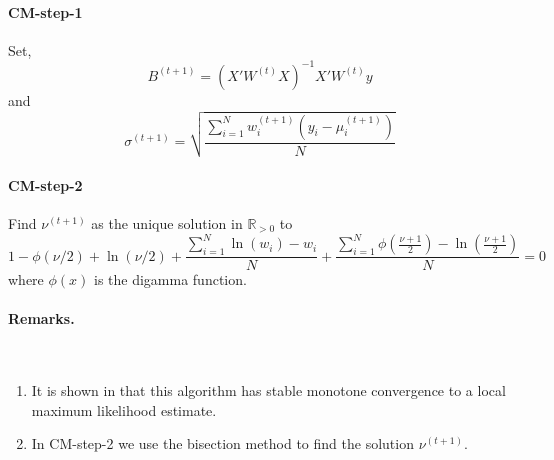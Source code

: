 \documentclass[11pt, a4 paper]{article}
\begin{document}
\paragraph{CM-step-1}
Set,
\[
B^{(t+1)} = (X'W^{(t)}X)^{-1}X'W^{(t)}y
\]
and
\[
\sigma^{(t+1)} = \sqrt{\frac{\sum_{i=1}^N w_i^{(t+1)}(y_i - \mu_i^{(t+1)})}{N}}
\]

\paragraph{CM-step-2} Find $\nu^{(t+1)}$ as the unique solution in $\mathbb{R}_{>0}$ to
\[
1 - \phi(\nu/2) + \ln(\nu/2) + \frac{\sum_{i=1}^N \ln(w_i) - w_i}{N}  + \frac{\sum_{i=1}^N \phi \left( \frac{\nu+1}{2} \right) - \ln \left( \frac{\nu+1}{2} \right)}{N} = 0
\]
where $\phi(x)$ is the digamma function.

\paragraph{Remarks.}~
\begin{enumerate}
\item It is shown in \cite{LiuRubin} that this algorithm has stable monotone convergence to a local maximum likelihood estimate.
\item In CM-step-2 we use the bisection method to find the solution $\nu^{(t+1)}$.
\end{enumerate}








\end{document}
